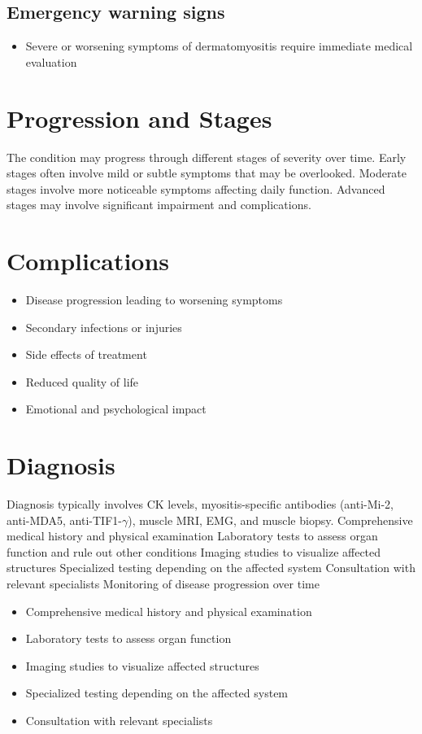 \subsection{Emergency warning signs}
\begin{itemize}[noitemsep]
  \item Severe or worsening symptoms of dermatomyositis require immediate medical evaluation
\end{itemize}
\section{Progression and Stages}
The condition may progress through different stages of severity over time. Early stages often involve mild or subtle symptoms that may be overlooked. Moderate stages involve more noticeable symptoms affecting daily function. Advanced stages may involve significant impairment and complications.
\section{Complications}
\begin{itemize}[noitemsep]
  \item Disease progression leading to worsening symptoms
  \item Secondary infections or injuries
  \item Side effects of treatment
  \item Reduced quality of life
  \item Emotional and psychological impact
\end{itemize}
\section{Diagnosis}
Diagnosis typically involves CK levels, myositis-specific antibodies (anti-Mi-2, anti-MDA5, anti-TIF1-$\gamma$), muscle MRI, EMG, and muscle biopsy. Comprehensive medical history and physical examination Laboratory tests to assess organ function and rule out other conditions Imaging studies to visualize affected structures Specialized testing depending on the affected system Consultation with relevant specialists Monitoring of disease progression over time

\begin{itemize}[noitemsep]
  \item Comprehensive medical history and physical examination
  \item Laboratory tests to assess organ function
  \item Imaging studies to visualize affected structures
  \item Specialized testing depending on the affected system
  \item Consultation with relevant specialists
\end{itemize}
